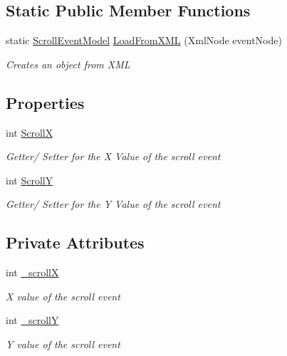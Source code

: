 \subsection*{Static Public Member Functions}
\begin{DoxyCompactItemize}
\item 
static \hyperlink{class_web_analyzer_1_1_models_1_1_event_model_1_1_scroll_event_model}{Scroll\+Event\+Model} \hyperlink{class_web_analyzer_1_1_models_1_1_event_model_1_1_scroll_event_model_a1ab3066559cf15e8a145e3d38aecc4ab}{Load\+From\+X\+M\+L} (Xml\+Node event\+Node)
\begin{DoxyCompactList}\small\item\em Creates an object from X\+M\+L \end{DoxyCompactList}\end{DoxyCompactItemize}
\subsection*{Properties}
\begin{DoxyCompactItemize}
\item 
int \hyperlink{class_web_analyzer_1_1_models_1_1_event_model_1_1_scroll_event_model_a76d4f01379c721923cb59d88e2c0fc4a}{Scroll\+X}
\begin{DoxyCompactList}\small\item\em Getter/ Setter for the X Value of the scroll event \end{DoxyCompactList}\item 
int \hyperlink{class_web_analyzer_1_1_models_1_1_event_model_1_1_scroll_event_model_a3e94660e7ec7eb2af5fc06022fbddbcd}{Scroll\+Y}
\begin{DoxyCompactList}\small\item\em Getter/ Setter for the Y Value of the scroll event \end{DoxyCompactList}\end{DoxyCompactItemize}
\subsection*{Private Attributes}
\begin{DoxyCompactItemize}
\item 
int \hyperlink{class_web_analyzer_1_1_models_1_1_event_model_1_1_scroll_event_model_a1fa876768fe33fc66ba5cd358cd523e1}{\+\_\+scroll\+X}
\begin{DoxyCompactList}\small\item\em X value of the scroll event \end{DoxyCompactList}\item 
int \hyperlink{class_web_analyzer_1_1_models_1_1_event_model_1_1_scroll_event_model_a72e1d630edcd50e5f179faae87220ed6}{\+\_\+scroll\+Y}
\begin{DoxyCompactList}\small\item\em Y value of the scroll event \end{DoxyCompactList}\end{DoxyCompactItemize}
